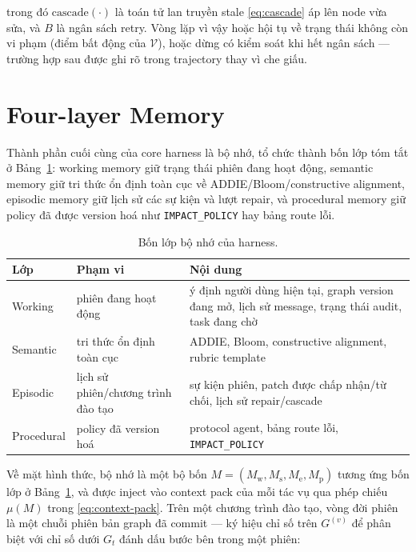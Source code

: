 \documentclass[../main.tex]{subfiles}
\begin{document}
trong đó $\mathrm{cascade}(\cdot)$ là toán tử lan truyền stale \eqref{eq:cascade} áp lên node vừa sửa, và $B$ là ngân sách retry. Vòng lặp vì vậy hoặc hội tụ về trạng thái không còn vi phạm (điểm bất động của $\mathcal{V}$), hoặc dừng có kiểm soát khi hết ngân sách — trường hợp sau được ghi rõ trong trajectory thay vì che giấu.

\section{Four-layer Memory}

Thành phần cuối cùng của core harness là bộ nhớ, tổ chức thành bốn lớp tóm tắt ở Bảng~\ref{tab:memory-layers}: working memory giữ trạng thái phiên đang hoạt động, semantic memory giữ tri thức ổn định toàn cục về ADDIE/Bloom/constructive alignment, episodic memory giữ lịch sử các sự kiện và lượt repair, và procedural memory giữ policy đã được version hoá như \texttt{IMPACT\_POLICY} hay bảng route lỗi.

\begin{table}[H]
\centering
\small
\caption{Bốn lớp bộ nhớ của harness.}
\label{tab:memory-layers}
\begin{tabular}{p{2.2cm}p{3.2cm}p{7.2cm}}
\hline
\textbf{Lớp} & \textbf{Phạm vi} & \textbf{Nội dung} \\
\hline
Working & phiên đang hoạt động & ý định người dùng hiện tại, graph version đang mở, lịch sử message, trạng thái audit, task đang chờ \\
Semantic & tri thức ổn định toàn cục & ADDIE, Bloom, constructive alignment, rubric template \\
Episodic & lịch sử phiên/chương trình đào tạo & sự kiện phiên, patch được chấp nhận/từ chối, lịch sử repair/cascade \\
Procedural & policy đã version hoá & protocol agent, bảng route lỗi, \texttt{IMPACT\_POLICY} \\
\hline
\end{tabular}
\end{table}

Về mặt hình thức, bộ nhớ là một bộ bốn $M = (M_{\mathrm{w}}, M_{\mathrm{s}}, M_{\mathrm{e}}, M_{\mathrm{p}})$ tương ứng bốn lớp ở Bảng~\ref{tab:memory-layers}, và được inject vào context pack của mỗi tác vụ qua phép chiếu $\mu(M)$ trong \eqref{eq:context-pack}. Trên một chương trình đào tạo, vòng đời phiên là một chuỗi phiên bản graph đã commit — ký hiệu chỉ số trên $G^{(v)}$ để phân biệt với chỉ số dưới $G_t$ đánh dấu bước bên trong một phiên:
\end{document}
